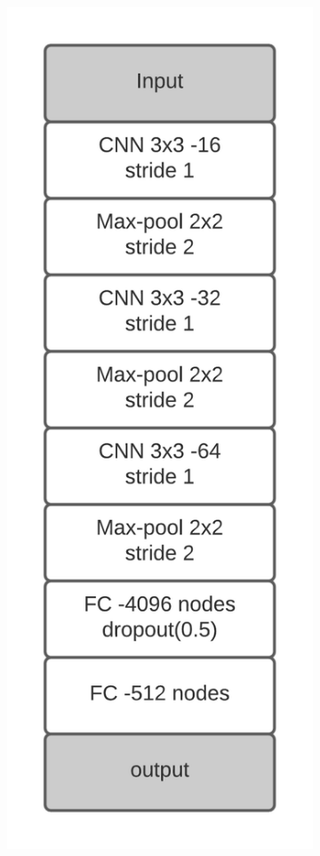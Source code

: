 \documentclass{article}
\begin{document}
\begin{figure}[h!]
	\begin{subfigure}[t]{.23\textwidth}
	  \centering
	  \includegraphics[scale=0.66]{../code/images/Net1_layers.png}  

\end{subfigure}
\end{figure}
\end{document}
